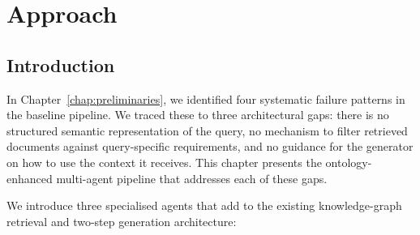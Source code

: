 \chapter{Approach}
\label{chap:approach}

\section{Introduction}
\label{sec:approach-intro}

In Chapter~\ref{chap:preliminaries}, we identified four systematic failure patterns in the baseline pipeline. We traced these to three architectural gaps: there is no structured semantic representation of the query, no mechanism to filter retrieved documents against query-specific requirements, and no guidance for the generator on how to use the context it receives. This chapter presents the ontology-enhanced multi-agent pipeline that addresses each of these gaps.

We introduce three specialised agents that add to the existing knowledge-graph retrieval and two-step generation architecture:

